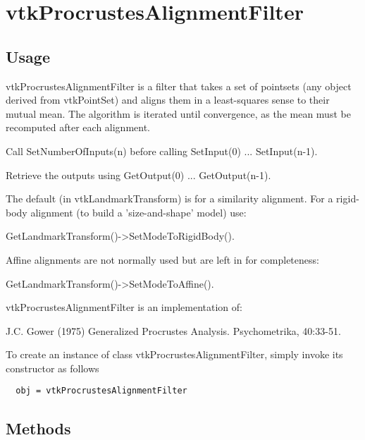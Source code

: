 \section{vtkProcrustesAlignmentFilter}

\subsection{Usage}

 
 vtkProcrustesAlignmentFilter is a filter that takes a set of pointsets
 (any object derived from vtkPointSet) and aligns them in a least-squares 
 sense to their mutual mean. The algorithm is iterated until convergence, 
 as the mean must be recomputed after each alignment. 

 Call SetNumberOfInputs(n) before calling SetInput(0) ... SetInput(n-1).

 Retrieve the outputs using GetOutput(0) ... GetOutput(n-1).

 The default (in vtkLandmarkTransform) is for a similarity alignment.
 For a rigid-body alignment (to build a 'size-and-shape' model) use: 

    GetLandmarkTransform()->SetModeToRigidBody(). 

 Affine alignments are not normally used but are left in for completeness:

    GetLandmarkTransform()->SetModeToAffine(). 

 vtkProcrustesAlignmentFilter is an implementation of:

    J.C. Gower (1975) 
    Generalized Procrustes Analysis. Psychometrika, 40:33-51.


To create an instance of class vtkProcrustesAlignmentFilter, simply
invoke its constructor as follows
\begin{verbatim}
  obj = vtkProcrustesAlignmentFilter
\end{verbatim}
\subsection{Methods}


